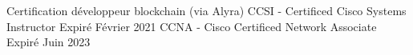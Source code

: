 
\begin{cvskills}
  \cvskill
    {Certification développeur blockchain (via Alyra)}
    {}
  \cvskill
    {CCSI - Certificed Cisco Systems Instructor}
    {Expiré Février 2021}
  \cvskill
    {CCNA - Cisco Certificed Network Associate}
    {Expiré Juin 2023}
\end{cvskills}